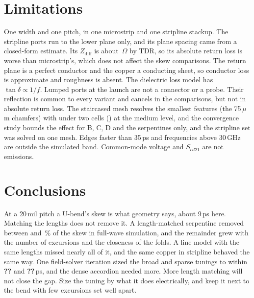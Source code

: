 \documentclass[10pt,twocolumn]{article}
\newcommand{\Missing}{\textbf{??}}
\providecommand{\SkewCcal}{\Missing}
\providecommand{\SkewFcal}{\Missing}
\newcommand{\Scd}[1]{S_{cd#1}}
\begin{document}
\section{Limitations}
\label{sec:limitations}

One width and one pitch, in one microstrip and one stripline stackup. The stripline ports run to the lower
plane only, and its plane spacing came from a closed-form estimate. Its $Z_\mathrm{diff}$ is about
\ZmaxBsl\,$\Omega$ by TDR, so its absolute return loss is worse than microstrip's, which does not affect the
skew comparisons. The return plane is a perfect conductor and the copper a
conducting sheet, so conductor loss is approximate and roughness is absent. The dielectric loss model has
$\tan\delta \propto 1/f$. Lumped ports at the launch are not a connector or a probe. Their reflection is common to
every variant and cancels in the comparisons, but not in absolute return loss. The staircased mesh resolves the
smallest features (the 75\,$\mu$m chamfers) with under two cells (\ChamferCellsMedium) at the medium level, and the convergence study
bounds the effect for B, C, D and the serpentines only, and the stripline set was solved on one mesh. Edges faster than 35\,ps and frequencies above 30\,GHz are outside the
simulated band. Common-mode voltage and $\Scd{21}$ are not emissions.

\section{Conclusions}

At a 20\,mil pitch a U-bend's skew is what geometry says, about 9\,ps here. Matching the lengths does not remove
it. A length-matched serpentine removed between \RemovedPctD{} and \RemovedPctF\,\% of the skew in full-wave
simulation, and the
remainder grew with the number of excursions and the closeness of the folds. A line model with the same lengths
missed nearly all of it, and the same copper in stripline behaved the same way. One field-solver iteration sized
the broad and sparse tunings to within \SkewFcal{} and \SkewCcal\,ps, and the dense accordion needed more. More length matching will not
close the gap. Size the tuning by what it does electrically, and keep it next to the bend with few excursions set
well apart.

\small
\raggedright


\end{document}
